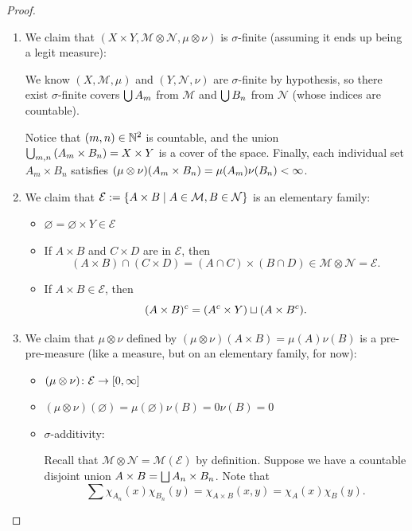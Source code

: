 \documentclass[11pt,leqno,oneside]{amsbook}
\numberwithin{thm}{section}
\newcommand{\M}{\mathcal{M}} %
\newcommand{\E}{\mathcal{E}}
\newcommand{\cN}{\mathcal{N}}
\newcommand{\s}{$\sigma$-} %
\newcommand{\x}{\times}
\newcommand{\ox}{\otimes}
\renewcommand{\emptyset}{\varnothing}
\begin{document}
\begin{proof}
  \mbox{}
  \begin{enumerate}[label=(\arabic{*})]
    \item We claim that $(X \x Y, \M \ox \cN, \mu \ox \nu)$ is \s finite (assuming it ends up being a legit measure):

    We know $(X, \M, \mu)$ and $(Y, \cN, \nu)$ are \s finite by hypothesis, so there exist \s finite covers $\bigcup A_m$ from $\M$ and $\bigcup B_n$ from $\cN$ (whose indices are countable).

    Notice that $(m, n) \in {\mathbb N}^2$ is countable, and the union $\Union_{m,n}\left(A_m \x B_n\right) = X \x Y$ is a cover of the space.  Finally, each individual set $A_m \x B_n$ satisfies $(\mu\ox\nu)(A_m \x B_n) = \mu(A_m)\nu(B_n) < \oo$.

    \item We claim that $\E := \{A \x B \st A \in \M, B \in \cN\}$ is an elementary family:

    \begin{itemize}
      \item $\emptyset = \emptyset \x Y \in \E$
      \item If $A \x B$ and $C \x D$ are in $\E$, then $$(A \x B) \cap (C \x D) = (A \cap C) \x (B \cap D) \in \M \ox \cN = \E.$$
      \item If $A \x B \in \E$, then $$(A \x B)^c = (A^c \x Y) \dunion (A \x B^c).$$
    \end{itemize}

    \item We claim that $\mu \ox \nu$ defined by $(\mu\ox\nu)(A \x B) = \mu(A)\nu(B)$ is a pre-pre-measure (like a measure, but on an elementary family, for now):

    \begin{itemize}
      \item $(\mu\ox\nu)\from\E\to[0, \oo]$
      \item $(\mu\ox\nu)(\emptyset) = \mu(\emptyset)\nu(B) = 0\nu(B) = 0$
      \item \s additivity:

      Recall that $\M \ox \cN = \M(\E)$ by definition.  Suppose we have a countable disjoint union $A \x B = \Dunion A_n \x B_n$.  Note that
      $$\sum \chi_{A_n}(x)\chi_{B_n}(y) = \chi_{A \x B}(x,y) = \chi_A(x)\chi_B(y).$$


\end{itemize}
\end{enumerate}
\end{proof}
\end{document}
